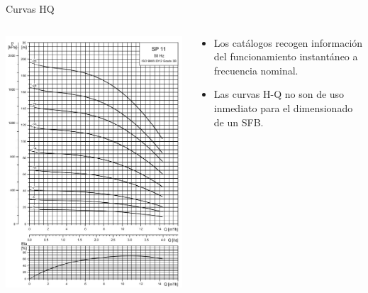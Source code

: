 \documentclass[xcolor={usenames,svgnames,dvipsnames}]{beamer}
\begin{document}
\begin{frame}[label={sec:org3f3b55d}]{Curvas HQ}
\begin{columns}
\begin{column}{0.5\columnwidth}
\begin{center}
\includegraphics[height=0.8\textheight]{../figs/CurvaSP11.jpg}
\end{center}
\end{column}

\begin{column}{0.5\columnwidth}
\begin{itemize}
\item Los catálogos recogen información del \alert{funcionamiento instantáneo a frecuencia nominal}.
\item Las curvas H-Q \alert{no} son de uso inmediato para el dimensionado de un SFB.
\end{itemize}
\end{column}
\end{columns}
\end{frame}
\end{document}
